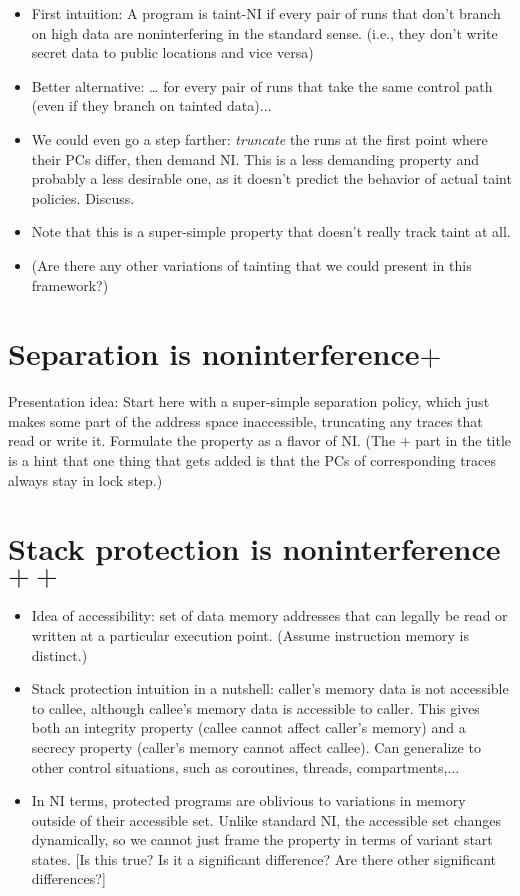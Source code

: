 \documentclass[conference]{IEEEtran}
\begin{document}
\begin{itemize}
\item First intuition: A program is taint-NI if every pair of runs that don’t
branch on high data are noninterfering in the standard sense.  (i.e., they
don't write secret data to public locations and vice versa)
\item Better alternative: … for every pair of runs that take the same control path (even if they branch on tainted data)...
\item We could even go a step farther: {\em truncate} the runs at the
  first point where their PCs differ, then demand NI.  This is a less
  demanding property and probably a less desirable one, as it doesn't
  predict the behavior of actual taint policies.  Discuss.
\item Note that this is a super-simple property that doesn't really track
taint at all.
\item (Are there any other variations of tainting that we could present in
this framework?)
\end{itemize}


\section{Separation is noninterference$+$}

Presentation idea: Start here with a super-simple separation policy, which
just makes some part of the address space inaccessible, truncating any
traces that read or write it.  Formulate the property as a flavor of NI.
(The $+$ part in the title is a hint that one thing that gets added is that
the PCs of corresponding traces always stay in lock step.)

\section{Stack protection is noninterference$++$}

\begin{itemize}
\item
  Idea of accessibility: set of data memory addresses that can legally be read or written at a particular execution point.
  (Assume instruction memory is distinct.)
\item
  Stack protection intuition in a nutshell: caller's memory data is not accessible to callee, although callee's memory data is accessible to caller.
  This gives both an integrity property (callee cannot affect caller's memory) and a secrecy property
  (caller's memory cannot affect callee).
  Can generalize to other control situations, such as coroutines, threads, compartments,...
\item
  In NI terms, protected programs are oblivious to variations in memory outside of their accessible set.
  Unlike standard NI, the accessible set changes dynamically, so we cannot just frame the property in terms of
  variant start states. [Is this true? Is it a significant difference? Are there other significant differences?]
\end{itemize}
\end{document}
